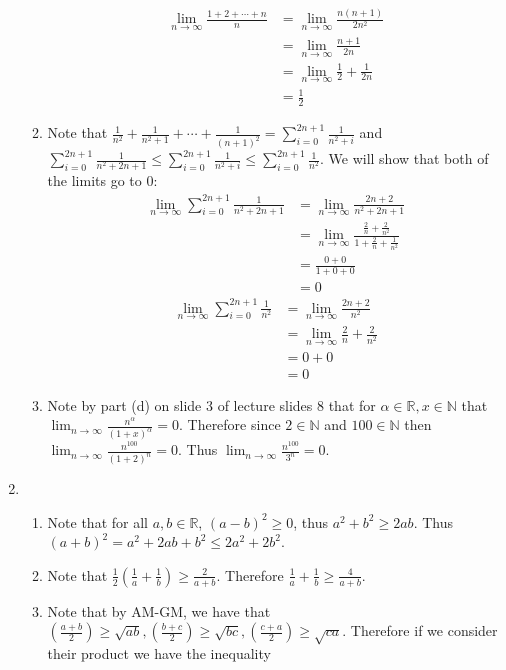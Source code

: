 \documentclass[12pt, letterpaper]{article}
\newcommand{\N}{\mathbb{N}}
\newcommand{\R}{\mathbb{R}}
\begin{document}
\begin{enumerate}
\begin{enumerate}
\begin{align*}
			\lim_{n \to \infty} \frac{1 + 2 + \cdots + n}{n} &= \lim_{n \to \infty} \frac{n(n+1)}{2n^2}\\
			&= \lim_{n \to \infty} \frac{n+1}{2n}\\
			&= \lim_{n \to \infty} \frac{1}{2} + \frac{1}{2n}\\
			&= \frac{1}{2}
		\end{align*}
		\item Note that $\frac{1}{n^2} + \frac{1}{n^2+1} + \cdots + \frac{1}{(n+1)^2} = \sum_{i=0}^{2n+1} \frac{1}{n^2+i}$ and $ \sum_{i=0}^{2n+1} \frac{1}{n^2+2n+1} \leq \sum_{i=0}^{2n+1} \frac{1}{n^2+i}\leq \sum_{i=0}^{2n+1} \frac{1}{n^2}$.  We will show that both of the limits go to 0:
		\begin{align*}
			\lim_{n \to \infty} \sum_{i=0}^{2n+1} \frac{1}{n^2+2n+1} &= \lim_{n \to \infty} \frac{2n+2}{n^2 + 2n + 1}\\
			&= \lim_{n \to \infty} \frac{\frac{2}{n} + \frac{2}{n^2}}{1 + \frac{2}{n} + \frac{1}{n^2}}\\
			&= \frac{0 + 0}{1 + 0 + 0}\\
			&= 0
		\end{align*}
		\begin{align*}
			\lim_{n \to \infty} \sum_{i=0}^{2n+1} \frac{1}{n^2} &= \lim_{n \to \infty} \frac{2n+2}{n^2}\\
			&= \lim_{n \to \infty} \frac{2}{n} + \frac{2}{n^2}\\
			&= 0 + 0\\
			&= 0
		\end{align*}
		\item Note by part (d) on slide 3 of lecture slides 8 that for $\alpha \in \R, x \in \N$ that $\lim_{n \to \infty} \frac{n^\alpha}{(1+x)^\alpha} = 0$.
		Therefore since $2 \in \N$ and $100 \in \N$ then $\lim_{n \to \infty}\frac{n^{100}}{(1+2)^n}  = 0$.  Thus $\lim_{n \to \infty} \frac{n^{100}}{3^n} = 0$.
	\end{enumerate}
	\item
	\begin{enumerate}
		\item Note that for all $a,b \in \R$, $(a-b)^2 \geq 0$, thus $a^2 + b^2 \geq 2ab$.  Thus $(a+b)^2 = a^2 + 2ab + b^2 \leq 2a^2 + 2b^2$.
		\item Note that $\frac{1}{2}(\frac{1}{a} + \frac{1}{b}) \geq \frac{2}{a + b}$.  Therefore $\frac{1}{a} + \frac{1}{b} \geq \frac{4}{a + b}$.
		\item Note that by AM-GM, we have that $\left(\frac{a+b}{2}\right)\geq \sqrt{ab},\left(\frac{b+c}{2}\right)\geq \sqrt{bc},\left(\frac{c+a}{2}\right)\geq \sqrt{ca}$.  Therefore if we consider their product we have the inequality 

\end{enumerate}
\end{enumerate}
\end{document}
